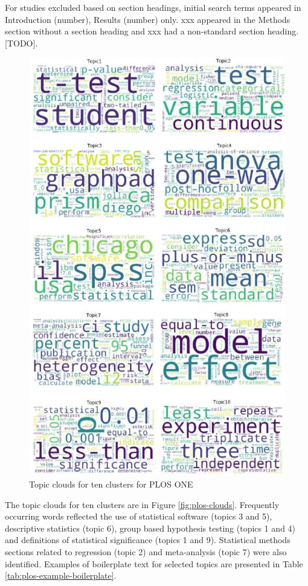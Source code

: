 \documentclass[12pt]{article}
\begin{document}
For studies excluded based on section headings, initial search terms
appeared in Introduction (number), Results (number) only. xxx appeared
in the Methods section without a section heading and xxx had a
non-standard section heading. {[}TODO{]}.

\begin{figure}

{\centering \includegraphics[width=0.8\linewidth]{figures/ploswordclouds} 

}

\caption{\label{fig:plos-clouds}Topic clouds for ten clusters for PLOS ONE}\label{fig:unnamed-chunk-6}
\end{figure}

The topic clouds for ten clusters are in Figure \ref{fig:plos-clouds}.
Frequently occurring words reflected the use of statistical software
(topics 3 and 5), descriptive statistics (topic 6), group based
hypothesis testing (topics 1 and 4) and definitions of statistical
significance (topics 1 and 9). Statistical methods sections related to
regression (topic 2) and meta-analysis (topic 7) were also identified.
Examples of boilerplate text for selected topics are presented in Table
\ref{tab:plos-example-boilerplate}.
\end{document}
